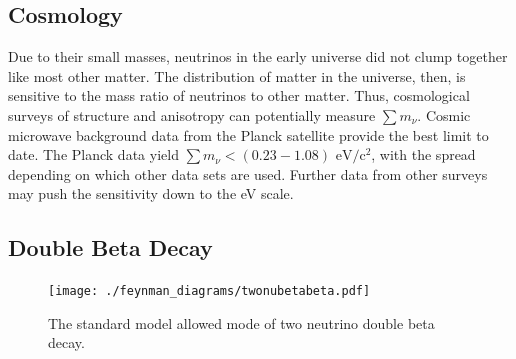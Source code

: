 \documentclass[herrin-thesis.tex]{subfiles}
\begin{document}
\subsection{Cosmology}
Due to their small masses, neutrinos in the early universe did not clump together like most other matter. The distribution of matter in the universe, then, is sensitive to the mass ratio of neutrinos to other matter. Thus, cosmological surveys of structure and anisotropy can potentially measure \(\sum m_{\nu}\). Cosmic microwave background data from the Planck satellite provide the best limit to date. The Planck data yield \(\sum m_{\nu} < (0.23 - 1.08) \text{ eV}/\text{c}^2\), with the spread depending on which other data sets are used\cite{Ade:2013kl}. Further data from other surveys may push the sensitivity down to the \si{\eV} scale\cite{Abazajian:2011tg}.

\subsection{Double Beta Decay}

\begin{figure}[htb]
	\centering
	\texttt{[image: ./feynman\_diagrams/twonubetabeta.pdf]}
	\caption[Diagram of \(2\nu\beta\beta\)]{The standard model allowed mode of two neutrino double beta decay.}
	\label{fig:nu_diagram_2nubb}
\end{figure}
\end{document}

